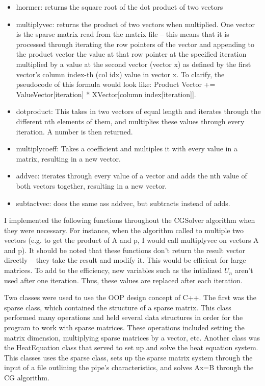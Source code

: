 \documentclass[12pt]{article} %
\begin{document}
\begin{itemize}
\item lnormer: returns the square root of the dot product of two vectors
\item multiplyvec: returns the product of two vectors when multiplied. One vector is the sparse matrix read from the matrix file -- this means that it is processed through iterating the row pointers of the vector and appending to the product vector the value at that row pointer at the specified iteration multiplied by a value at the second vector (vector x) as defined by the first vector's column index-th (col idx) value in vector x. To clarify, the pseudocode of this formula would look like: Product Vector += ValueVector[iteration] * XVector[column index[iteration]].
\item dotproduct: This takes in two vectors of equal length and iterates through the different nth elements of them, and multiplies these values through every iteration. A number is then returned. 
\item multiplycoeff: Takes a coefficient and multiples it with every value in a matrix, resulting in a new vector.
\item addvec: iterates through every value of a vector and adds the nth value of both vectors together, resulting in a new vector. 
\item subtactvec: does the same ass addvec, but subtracts instead of adds. 
\end{itemize}

I implemented the following functions throughout the CGSolver algorithm when they were necessary. For instance, when the algorithm called to multiple two vectors (e.g. to get the product of A and p, I would call multiplyvec on vectors A and p). It should be noted that these functions don't return the result vector directly -- they take the result and modify it. This would be efficient for large matrices. To add to the efficiency, new variables such as the intialized $U_{n}$ aren't used after one iteration. Thus, these values are replaced after each iteration. 

Two classes were used to use the OOP design concept of C++. The first was the sparse class, which contained the structure of a sparse matrix. This class performed many operations and held several data structures in order for the program to work with sparse matrices. These operations included setting the matrix dimension, multiplying sparse matrices by a vector, etc. Another class was the HeatEquation class that served to set up and solve the heat equation system. This classes uses the sparse class, sets up the sparse matrix system through the input of a file outlining the pipe's characteristics, and solves Ax=B through the CG algorithm. 
\medskip
\end{document}
